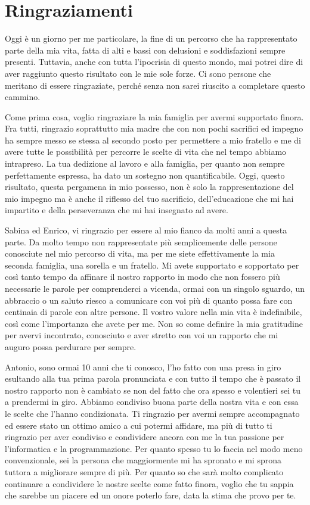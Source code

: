 \chapter*{Ringraziamenti}
\fancyhf{}

Oggi è un giorno per me particolare, la fine di un percorso che ha rappresentato parte della mia vita, fatta di alti e bassi con delusioni e soddisfazioni sempre presenti. Tuttavia, anche con tutta l'ipocrisia di questo mondo, mai potrei dire di aver raggiunto questo risultato con le mie sole forze. Ci sono persone che meritano di essere ringraziate, perché senza non sarei riuscito a completare questo cammino.

Come prima cosa, voglio ringraziare la mia famiglia per avermi supportato finora. Fra tutti, ringrazio soprattutto mia madre che con non pochi sacrifici ed impegno ha sempre messo se stessa al secondo posto per permettere a mio fratello e me di avere tutte le possibilità per percorre le scelte di vita che nel tempo abbiamo intrapreso. La tua dedizione al lavoro e alla famiglia, per quanto non sempre perfettamente espressa, ha dato un sostegno non quantificabile. Oggi, questo risultato, questa pergamena in mio possesso, non è solo la rappresentazione del mio impegno ma è anche il riflesso del tuo sacrificio, dell'educazione che mi hai impartito e della perseveranza che mi hai insegnato ad avere.

Sabina ed Enrico, vi ringrazio per essere al mio fianco da molti anni a questa parte. Da molto tempo non rappresentate più semplicemente delle persone conosciute nel mio percorso di vita, ma per me siete effettivamente la mia seconda famiglia, una sorella e un fratello. Mi avete supportato e sopportato per così tanto tempo da affinare il nostro rapporto in modo che non fossero più necessarie le parole per comprenderci a vicenda, ormai con un singolo sguardo, un abbraccio o un saluto riesco a comunicare con voi più di quanto possa fare con centinaia di parole con altre persone. Il vostro valore nella mia vita è indefinibile, così come l'importanza che avete per me. Non so come definire la mia gratitudine per avervi incontrato, conosciuto e aver stretto con voi un rapporto che mi auguro possa perdurare per sempre.

Antonio, sono ormai 10 anni che ti conosco, l'ho fatto con una presa in giro esultando alla tua prima parola pronunciata e con tutto il tempo che è passato il nostro rapporto non è cambiato se non del fatto che ora spesso e volentieri sei tu a prendermi in giro. Abbiamo condiviso buona parte della nostra vita e con essa le scelte che l'hanno condizionata. Ti ringrazio per avermi sempre accompagnato ed essere stato un ottimo amico a cui potermi affidare, ma più di tutto ti ringrazio per aver condiviso e condividere ancora con me la tua passione per l'informatica e la programmazione. Per quanto spesso tu lo faccia nel modo meno convenzionale, sei la persona che maggiormente mi ha spronato e mi sprona tuttora a migliorare sempre di più. Per quanto so che sarà molto complicato continuare a condividere le nostre scelte come fatto finora, voglio che tu sappia che sarebbe un piacere ed un onore poterlo fare, data la stima che provo per te.

